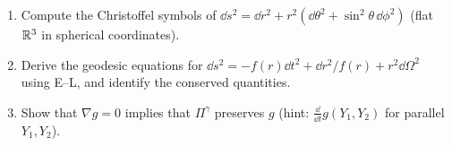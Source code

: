 \begin{exercises}
\begin{enumerate}[nosep]
\item Compute the Christoffel symbols of $\dd s^2=\dd r^2+r^2(\dd\theta^2+\sin^2\theta\,\dd\phi^2)$ (flat $\mathbb{R}^3$ in spherical coordinates).
\item Derive the geodesic equations for $\dd s^2=-f(r)\dd t^2+\dd r^2/f(r)+r^2\dd\Omega^2$ using E--L, and identify the conserved quantities.
\item Show that $\nabla g=0$ implies that $\Pi^\gamma$ preserves $g$ (hint: $\frac{\dd}{\dd t}g(Y_1,Y_2)$ for parallel $Y_1,Y_2$).
\end{enumerate}
\end{exercises}
